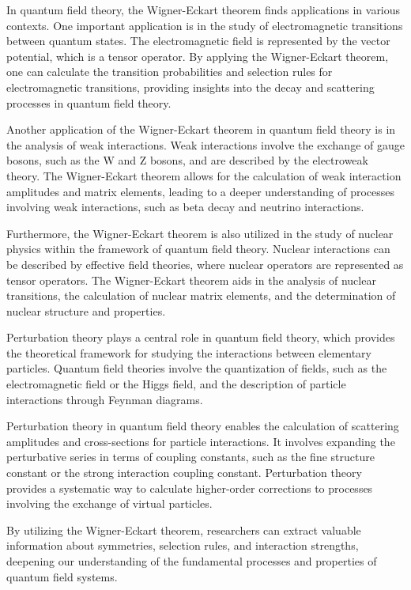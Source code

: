 \documentclass[a4paper,11pt]{article}
\begin{document}
In quantum field theory, the Wigner-Eckart theorem finds applications in various contexts. One important application is in the study of electromagnetic transitions between quantum states. The electromagnetic field is represented by the vector potential, which is a tensor operator. By applying the Wigner-Eckart theorem, one can calculate the transition probabilities and selection rules for electromagnetic transitions, providing insights into the decay and scattering processes in quantum field theory.


Another application of the Wigner-Eckart theorem in quantum field theory is in the analysis of weak interactions. Weak interactions involve the exchange of gauge bosons, such as the W and Z bosons, and are described by the electroweak theory. The Wigner-Eckart theorem allows for the calculation of weak interaction amplitudes and matrix elements, leading to a deeper understanding of processes involving weak interactions, such as beta decay and neutrino interactions.


Furthermore, the Wigner-Eckart theorem is also utilized in the study of nuclear physics within the framework of quantum field theory. Nuclear interactions can be described by effective field theories, where nuclear operators are represented as tensor operators. The Wigner-Eckart theorem aids in the analysis of nuclear transitions, the calculation of nuclear matrix elements, and the determination of nuclear structure and properties.

Perturbation theory plays a central role in quantum field theory, which provides the theoretical framework for studying the interactions between elementary particles. Quantum field theories involve the quantization of fields, such as the electromagnetic field or the Higgs field, and the description of particle interactions through Feynman diagrams.

Perturbation theory in quantum field theory enables the calculation of scattering amplitudes and cross-sections for particle interactions. It involves expanding the perturbative series in terms of coupling constants, such as the fine structure constant or the strong interaction coupling constant. Perturbation theory provides a systematic way to calculate higher-order corrections to processes involving the exchange of virtual particles.


By utilizing the Wigner-Eckart theorem, researchers can extract valuable information about symmetries, selection rules, and interaction strengths, deepening our understanding of the fundamental processes and properties of quantum field systems.
\end{document}
